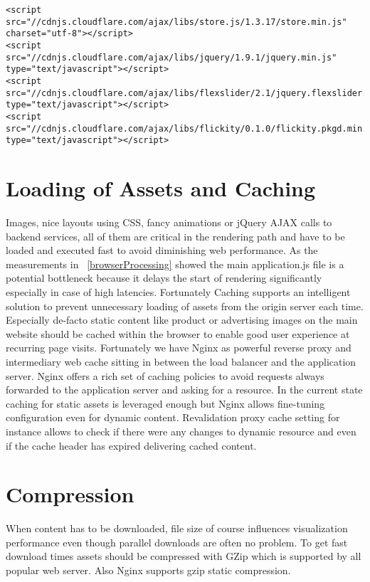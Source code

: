 \begin{lstlisting}[caption=Loading Javascript libraries from Cloudfare CDN]
<script src="//cdnjs.cloudflare.com/ajax/libs/store.js/1.3.17/store.min.js" charset="utf-8"></script>
<script src="//cdnjs.cloudflare.com/ajax/libs/jquery/1.9.1/jquery.min.js" type="text/javascript"></script>
<script src="//cdnjs.cloudflare.com/ajax/libs/flexslider/2.1/jquery.flexslider.js" type="text/javascript"></script>
<script src="//cdnjs.cloudflare.com/ajax/libs/flickity/0.1.0/flickity.pkgd.min.js" type="text/javascript"></script>
\end{lstlisting}

\section{Loading of Assets and Caching}

Images, nice layouts using CSS, fancy animations or jQuery AJAX calls to backend services, all of them are critical in the rendering path and have to be loaded and executed fast to avoid diminishing web performance. 
As the measurements in ~\ref{browserProcessing} showed the main application.js file is a potential bottleneck because it delays the start of rendering significantly especially in case of high latencies. Fortunately Caching supports an intelligent solution to prevent unnecessary loading of assets from the origin server each time. Especially de-facto static content like product or advertising images on the main website should be cached within the browser to enable good user experience at recurring page visits. Fortunately we have Nginx as powerful reverse proxy and intermediary web cache sitting in between the load balancer and the application server. Nginx offers a rich set of caching policies to avoid requests always forwarded to the application server and asking for a resource. In the current state caching for static assets is leveraged enough but Nginx allows fine-tuning configuration even for dynamic content. Revalidation proxy cache setting for instance allows to check if there were any changes to dynamic resource and even if the cache header has expired delivering cached content. 
 
\section{Compression}

When content has to be downloaded, file size of course influences visualization performance even though parallel downloads are often no problem. To get fast download times assets should be compressed with GZip which is supported by all popular web server. Also Nginx supports gzip static compression.

